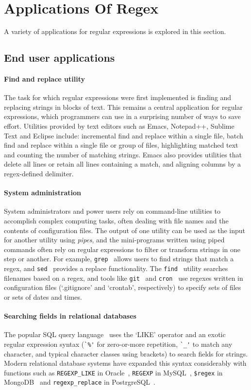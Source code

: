 \section{Applications Of Regex}
A variety of applications for regular expressions is explored in this section.

\subsection{End user applications}
\paragraph{Find and replace utility}
The task for which regular expressions were first implemented is finding and replacing strings in blocks of text.  This remains a central application for regular expressions, which programmers can use in a surprising number of ways to save effort.  Utilities provided by text editors such as Emacs, Notepad++, Sublime Text and Eclipse include: incremental find and replace within a single file, batch find and replace within a single file or group of files, highlighting matched text and counting the number of matching strings.  Emacs also provides utilities that delete all lines or retain all lines containing a match, and aligning columns by a regex-defined delimiter.

\paragraph{System administration}
System administrators and power users rely on command-line utilities to accomplish complex computing tasks, often dealing with file names and the contents of configuration files.  The output of one utility can be used as the input for another utility using \emph{pipes}, and the mini-programs written using piped commands often rely on regular expressions to filter or transform strings in one step or another.  For example, {\tt grep}~\citep{grepManual} allows users to find strings that match a regex, and {\tt sed}~\citep{sedManual} provides a replace functionality.  The {\tt find}~\citep{findManual} utility searches filenames based on a regex, and tools like {\tt git}~\citep{gitManual} and {\tt cron}~\citep{cronManual} use regexes written in configuration files (`.gitignore' and `crontab', respectively) to specify sets of files or sets of dates and times.

\paragraph{Searching fields in relational databases}
The popular SQL query language~\cite{Chamberlin:1974:SSE:800296.811515} uses the `LIKE' operator and an exotic regular expression syntax (\verb!`%'! for zero-or-more repetition, \verb!`_'! to match any character, and typical character classes using brackets) to search fields for strings.  Modern relational database systems have expanded this syntax considerably with functions such as {\tt REGEXP\_LIKE} in Oracle~\citep{OracleRegexpLike}, {\tt REGEXP} in MySQL~\citep{MySQLRegexp}, {\tt\$regex} in MongoDB~\citep{MongoDBregex} and {\tt regexp\_replace} in PostrgreSQL~\citep{PostgreSQLregexreplace}.


